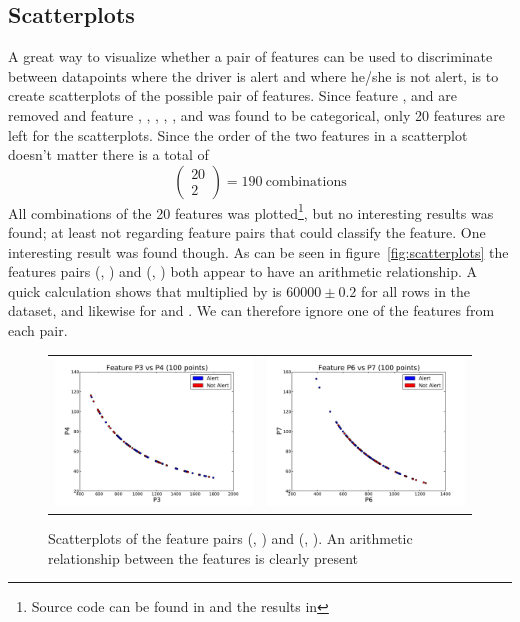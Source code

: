 \subsection{Scatterplots}\label{sec:scatterplots}
A great way to visualize whether a pair of features can be used to discriminate between datapoints where the driver is alert and where he/she is not alert, is to create scatterplots of the possible pair of features. Since feature ,  and  are removed and feature , , , , ,  and  was found to be categorical, only 20 features are left for the scatterplots. Since the order of the two features in a scatterplot doesn't matter there is a total of 
\[
    \begin{pmatrix}
        20 \\
        2
    \end{pmatrix} = 190\:\text{combinations}
\]
All combinations of the 20 features was plotted\footnote{Source code can be found in  and the results in }, but no interesting results was found; at least not regarding feature pairs that could classify the  feature. One interesting result was found though. As can be seen in figure~\ref{fig:scatterplots} the features pairs (, ) and (, ) both appear to have an arithmetic relationship. A quick calculation shows that  multiplied by  is $60000\pm0.2$ for all rows in the dataset, and likewise for  and . We can therefore ignore one of the features from each pair.
\begin{figure}
    \begin{tabularx}{\textwidth}{ X X }
        \includegraphics[width=.5\textwidth]{../sessions/24-writing-helper-scripts/plots/scatterplots/P3-P4.pdf} &
        \includegraphics[width=.5\textwidth]{../sessions/24-writing-helper-scripts/plots/scatterplots/P6-P7.pdf}
    \end{tabularx}
    \caption{Scatterplots of the feature pairs (, ) and (, ). An arithmetic relationship between the features is clearly present}
\end{figure}


